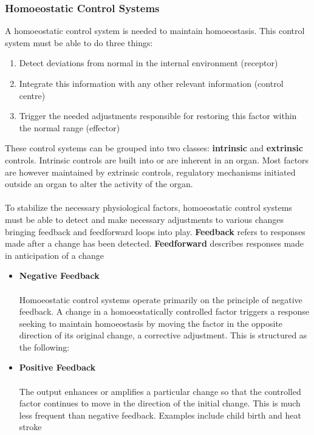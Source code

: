 \documentclass[11pt]{article}
\begin{document}
\subsubsection{Homoeostatic Control Systems}
A homoeostatic control system is needed to maintain homoeostasis. This control system must be able to do three things:
\begin{enumerate}
\item Detect deviations from normal in the internal environment (receptor)
\item Integrate this information with any other relevant information (control centre)
\item Trigger the needed adjustments responsible for restoring this factor within the normal range (effector)
\end{enumerate}
These control systems can be grouped into two classes: \textbf{intrinsic} and \textbf{extrinsic} controls. Intrinsic controls are built into or are inherent in an organ. Most factors are however maintained by extrinsic controls, regulatory mechanisms initiated outside an organ to alter the activity of the organ.
\\ \\
To stabilize the necessary physiological factors, homoeostatic control systems must be able to detect and make necessary adjustments to various changes bringing feedback and feedforward loops into play. \textbf{Feedback} refers to responses made after a change has been detected. \textbf{Feedforward} describes responses made in anticipation of a change

\begin{itemize}
\item \textbf{Negative Feedback} \\ \\
Homoeostatic control systems operate primarily on the principle of negative feedback. A change in a homoeostatically controlled factor triggers a response seeking to maintain homoeostasis by moving the factor in the opposite direction of its original change, a corrective adjustment. This is structured as the following:

\item \textbf{Positive Feedback} \\ \\
The output enhances or amplifies a particular change so that the controlled factor continues to move in the direction of the initial change. This is much less frequent than negative feedback. Examples include child birth and heat stroke

\end{itemize}
\end{document}
